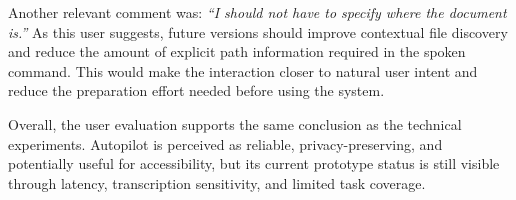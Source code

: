 Another relevant comment was: \textit{``I should not have to specify where the document is.''} As this user suggests, future versions should improve contextual file discovery and reduce the amount of explicit path information required in the spoken command. This would make the interaction closer to natural user intent and reduce the preparation effort needed before using the system.

Overall, the user evaluation supports the same conclusion as the technical experiments. Autopilot is perceived as reliable, privacy-preserving, and potentially useful for accessibility, but its current prototype status is still visible through latency, transcription sensitivity, and limited task coverage.
